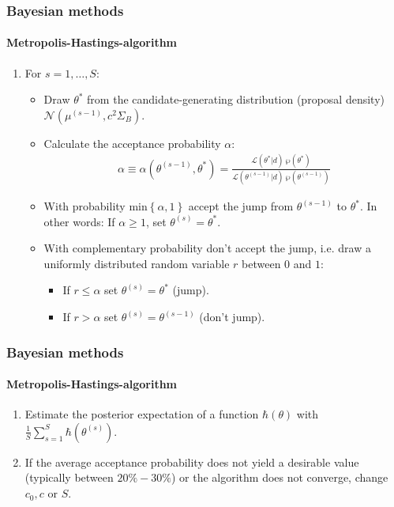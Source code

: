 \documentclass[handout]{beamer}  %
\newcounter{saveenumi}
\newcommand{\seti}{\setcounter{saveenumi}{\value{enumi}}}
\newcommand{\conti}{\setcounter{enumi}{\value{saveenumi}}}
\begin{document}
\begin{frame}\frametitle{Bayesian methods}\framesubtitle{Metropolis-Hastings-algorithm}
	\begin{enumerate}\conti
		\item For ${s}=1,\dots,S$:
		\begin{itemize}
			\item Draw ${\theta^*}$ from the candidate-generating distribution (proposal density)
			$\mathcal{N}({\mu^{(s-1)}},c^2{\Sigma_B})$.
			\item Calculate the acceptance probability $\alpha$:
			\begin{align*}
				\alpha \equiv \alpha\left({\theta^{(s-1)}},{\theta^*}\right) = \frac{\mathcal{L}\left({\theta^{*}}|{d}\right)~\wp\left({\theta^*}\right)}{\mathcal{L}\left({\theta^{(s-1)}}|{d}\right)~\wp\left({\theta^{(s-1)}}\right)}
			\end{align*}
			\item With probability
			$\text{min}\left\{\alpha,1\right\}$ accept the jump from ${\theta^{(s-1)}}$ to ${\theta^*}$.
			In other words: If $\alpha\geq1$, set ${\theta^{(s)}}={\theta^*}$.
			\item With complementary probability don't accept the jump, i.e. draw a uniformly distributed random variable $r$ between $0$ and $1$:
			\begin{itemize}
				\item If $r\leq\alpha$ set ${\theta^{(s)}}={\theta^*}$ (jump).
				\item If $r>\alpha$ set ${\theta^{(s)}}={\theta^{(s-1)}}$ (don't jump).
			\end{itemize}
		\end{itemize}
		\seti
	\end{enumerate}
	
\end{frame}

\begin{frame}\frametitle{Bayesian methods}\framesubtitle{Metropolis-Hastings-algorithm}
	\begin{enumerate}\conti
		\item Estimate the posterior expectation of a function
		$\hbar({\theta})$ with $\frac{1}{S}\sum_{s=1}^S
		\hbar\left({\theta^{(s)}}\right)$.
		\item If the average acceptance probability does not yield a desirable value (typically between $20\%-30\%$) or the algorithm does not converge, change $c_0,c$ or $S$.
	\end{enumerate}
	
\end{frame}
\end{document}
